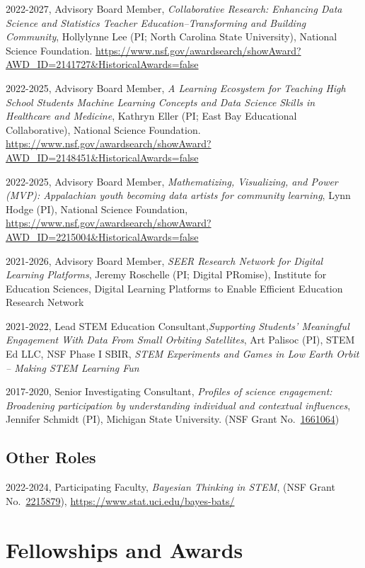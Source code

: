 \documentclass[
  14,
]{article}
\begin{document}
2022-2027, Advisory Board Member, \emph{Collaborative Research:
Enhancing Data Science and Statistics Teacher Education--Transforming
and Building Community}, Hollylynne Lee (PI; North Carolina State
University), National Science Foundation.
\url{https://www.nsf.gov/awardsearch/showAward?AWD_ID=2141727\&HistoricalAwards=false}

2022-2025, Advisory Board Member, \emph{A Learning Ecosystem for
Teaching High School Students Machine Learning Concepts and Data Science
Skills in Healthcare and Medicine}, Kathryn Eller (PI; East Bay
Educational Collaborative), National Science Foundation.
\url{https://www.nsf.gov/awardsearch/showAward?AWD_ID=2148451\&HistoricalAwards=false}

2022-2025, Advisory Board Member, \emph{Mathematizing, Visualizing, and
Power (MVP): Appalachian youth becoming data artists for community
learning}, Lynn Hodge (PI), National Science Foundation,
\url{https://www.nsf.gov/awardsearch/showAward?AWD_ID=2215004\&HistoricalAwards=false}

2021-2026, Advisory Board Member, \emph{SEER Research Network for
Digital Learning Platforms}, Jeremy Roschelle (PI; Digital PRomise),
Institute for Education Sciences, Digital Learning Platforms to Enable
Efficient Education Research Network

2021-2022, Lead STEM Education Consultant,\emph{Supporting Students'
Meaningful Engagement With Data From Small Orbiting Satellites}, Art
Palisoc (PI), STEM Ed LLC, NSF Phase I SBIR, \emph{STEM Experiments and
Games in Low Earth Orbit -- Making STEM Learning Fun}

2017-2020, Senior Investigating Consultant, \emph{Profiles of science
engagement: Broadening participation by understanding individual and
contextual influences}, Jennifer Schmidt (PI), Michigan State
University. (NSF Grant
No.~\href{https://nsf.gov/awardsearch/showAward?AWD_ID=1661064\&HistoricalAwards=false}{1661064})

\hypertarget{other-roles}{%
\subsection{Other Roles}\label{other-roles}}

2022-2024, Participating Faculty, \emph{Bayesian Thinking in STEM}, (NSF
Grant
No.~\href{https://www.nsf.gov/awardsearch/showAward?AWD_ID=2215879\&HistoricalAwards=false}{2215879}),
\url{https://www.stat.uci.edu/bayes-bats/}

\hypertarget{fellowships-and-awards}{%
\section{Fellowships and Awards}\label{fellowships-and-awards}}
\end{document}
